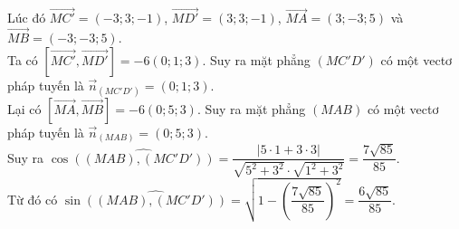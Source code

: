 \begin{ex}
{		Lúc đó $\overrightarrow{MC'}=\left(-3;3;-1\right)$, $\overrightarrow{MD'}=\left(3;3;-1\right)$, $\overrightarrow{MA}=\left(3;-3;5\right)$ và $\overrightarrow{MB}=\left(-3;-3;5\right)$.\\
		Ta có $\left[ \overrightarrow{MC'},\overrightarrow{MD'}\right]=-6\left(0;1;3\right)$. Suy ra mặt phẳng $(MC'D')$ có  một vectơ pháp tuyến  là
		$\vec{n}_{\left(MC'D'\right)}=(0;1;3)$.\\
		Lại có $\left[ \overrightarrow{MA},\overrightarrow{MB}\right]=-6\left(0;5;3\right)$. Suy ra mặt phẳng $(MAB)$ có một vectơ pháp tuyến  là
		$\vec{n}_{(MAB)}=(0;5;3)$. \\
		Suy ra $\cos \widehat{\left((MAB),(MC'D')\right)}=\dfrac{|5\cdot 1+3\cdot 3|}{\sqrt{5^2+3^2} \cdot \sqrt{1^2+3^2}}=\dfrac{7 \sqrt{85}}{85}$.\\
		Từ đó có $\sin \widehat{\left((MAB),(MC'D')\right)}=\sqrt{1-\left(\dfrac{7 \sqrt{85}}{85}\right)^2}=\dfrac{6 \sqrt{85}}{85}$.
	}
\end{ex}

